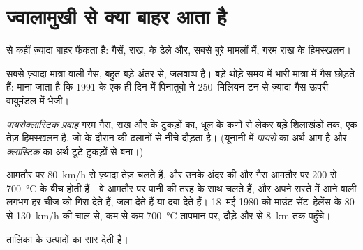 \section{ज्वालामुखी से क्या बाहर आता है}

  से कहीं ज़्यादा बाहर फेंकता है: गैसें, राख,  के ढेले और,
सबसे बुरे मामलों में, गरम राख के हिमस्खलन।

सबसे ज़्यादा मात्रा वाली गैस, बहुत बड़े अंतर से, जलवाष्प है। बड़े  थोड़े
समय में भारी मात्रा में गैस छोड़ते हैं: माना जाता है कि 1991 के एक ही दिन में
पिनातूबो ने 250~मिलियन टन से ज़्यादा गैस ऊपरी वायुमंडल में
भेजी।

\begin{definition}[पायरोक्लास्टिक प्रवाह]\label{def:g7:volcanoes:pyroclastic-flow}
\emph{पायरोक्लास्टिक प्रवाह} गरम गैस, राख और
 के टुकड़ों का, धूल के कणों से लेकर बड़े शिलाखंडों तक, एक तेज़ हिमस्खलन है,
जो  के दौरान  की ढलानों से नीचे दौड़ता है।
(यूनानी में \emph{पायरो} का अर्थ आग है और \emph{क्लास्टिक} का अर्थ टूटे टुकड़ों से बना।)
\end{definition}

 आमतौर पर \qty{80}{km/h} से ज़्यादा तेज़ चलते हैं, और उनके
अंदर की  और गैस आमतौर पर 200 से \qty{700}{\degreeCelsius} के बीच होती
हैं। वे आमतौर पर पानी की तरह  के साथ चलते हैं, और अपने रास्ते में आने वाली
लगभग हर चीज़ को गिरा देते हैं, जला देते हैं या दबा देते हैं। 18~मई 1980 को माउंट
सेंट~हेलेंस के  80 से \qty{130}{km/h} की चाल से, कम से कम
\qty{700}{\degreeCelsius} तापमान पर, दौड़े और  से \qty{8}{km} तक पहुँचे।

तालिका  के उत्पादों का सार देती है।


